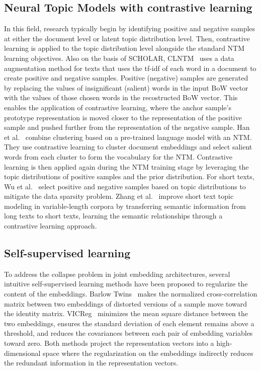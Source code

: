 \documentclass{article}
\begin{document}
\subsection{Neural Topic Models with contrastive learning}
In this field, research typically begin by identifying positive and negative samples at either the document level or latent topic distribution level. Then, contrastive learning is applied to the topic distribution level alongside the standard NTM learning objectives. 
Also on the basis of SCHOLAR, CLNTM~\cite{nguyen2021contrastive} uses a data augmentation method for texts that uses the tf-idf of each word in a document to create positive and negative samples. Positive (negative) samples are generated by replacing the values of insignificant (salient) words in the input BoW vector with the values of those chosen words in the recostructed BoW vector. This enables the application of contrastive learning, where the anchor sample's prototype representation is moved closer to the representation of the positive sample and pushed further from the representation of the negative sample.
Han et al.~\cite{han2023unified} combine clustering based on a pre-trained language model with an NTM. They use contrastive learning to cluster document embeddings and select salient words from each cluster to form the vocabulary for the NTM. Contrastive learning is then applied again during the NTM training stage by leveraging the topic distributions of positive samples and the prior distribution.
For short texts, Wu et al.~\cite{wu2022mitigating} select positive and negative samples based on topic distributions to mitigate the data sparsity problem. 
Zhang et al.~\cite{zhang2022meta} improve short text topic modeling in variable-length corpora by transferring semantic information from long texts to short texts, learning the semantic relationships through a contrastive learning approach.


\subsection{Self-supervised learning}
To address the collapse problem in joint embedding architectures, several intuitive self-supervised learning methods have been proposed to regularize the content of the embeddings.
Barlow Twins~\cite{zbontar2021barlow} makes the normalized cross-correlation matrix between two embeddings of distorted versions of a sample move toward the identity matrix.
VICReg~\cite{bardes2022vicreg} minimizes the mean square distance between the two embeddings, ensures the standard deviation of each element remains above a threshold, and reduces the covariances between each pair of embedding variables toward zero.
Both methods project the representation vectors into a high-dimensional space where the regularization on the embeddings indirectly reduces the redundant information in the representation vectors.
\end{document}
